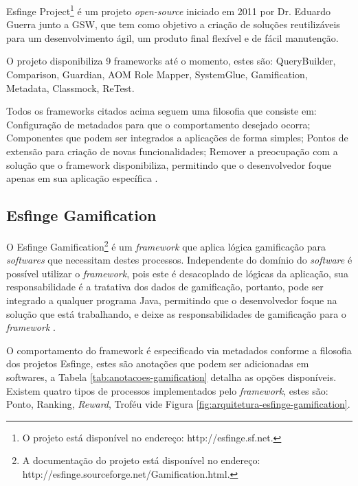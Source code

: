 \par Esfinge Project\footnote{O projeto está disponível no endereço: http://esfinge.sf.net.} é um projeto \textit{open-source} iniciado em 2011 por Dr. Eduardo Guerra junto a GSW, que tem como objetivo a criação de soluções reutilizáveis para um desenvolvimento ágil, um produto final flexível e de fácil manutenção.
\par O projeto disponibiliza 9 frameworks até o momento, estes são: QueryBuilder, Comparison, Guardian, AOM Role Mapper, SystemGlue, Gamification, Metadata, Classmock, ReTest.
\par Todos os frameworks citados acima seguem uma filosofia que consiste em: Configuração de metadados para que o comportamento desejado ocorra; Componentes que podem ser integrados a aplicações de forma simples; Pontos de extensão para criação de novas funcionalidades; Remover a preocupação com a solução que o framework disponibiliza, permitindo que o desenvolvedor foque apenas em sua aplicação específica \cite{esfinge2011}.

\subsection{Esfinge Gamification}

\par O Esfinge Gamification\footnote{A documentação do projeto está disponível no endereço: http://esfinge.sourceforge.net/Gamification.html.} é um \textit{framework} que aplica lógica gamificação para \textit{softwares} que necessitam destes processos. Independente do domínio do \textit{software} é possível utilizar o \textit{framework}, pois este é desacoplado de lógicas da aplicação, sua responsabilidade é a tratativa dos dados de gamificação, portanto, pode ser integrado a qualquer programa Java, permitindo que o desenvolvedor foque na solução que está trabalhando, e deixe as responsabilidades de gamificação para o \textit{framework}  \cite{esfinge2011}.


\par O comportamento do framework é especificado via metadados conforme a filosofia dos projetos Esfinge, estes são anotações que podem ser adicionadas em softwares, a Tabela \ref{tab:anotacoes-gamification} detalha as opções disponíveis. Existem quatro tipos de processos implementados pelo \textit{framework}, estes são: Ponto, Ranking, \textit{Reward}, Troféu vide Figura \ref{fig:arquitetura-esfinge-gamification}.

